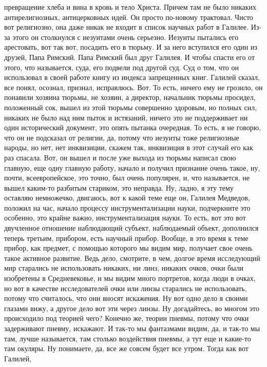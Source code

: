 превращение хлеба и вина в кровь и тело Христа. Причем там не было никаких
антирелигиозных, антицерковных идей. Он просто по-новому трактовал. Чисто вот
религиозно, она даже никак не входит в список научных работ в Галилее. Из-за
этого он столкнулся с иезуитами очень серьезно. Иезуиты пытались его арестовать,
вот так вот, посадить его в тюрьму. И за него вступился его один из друзей, Папа
Римский. Папа Римский был друг Галилея. И чтобы спасти его от этого, что
называется, суда, его подвели под другой суд. Суд о том, что он использовал в
своей работе книгу из индекса запрещенных книг. Галилей сказал, все понял,
осознал, признал, исправлюсь. Вот. То есть, ничего ему не грозило, он понавили
хозяина тюрьмы, не хозяин, а директор, начальник тюрьмы просидел, положенный
сок, вышел из этой тюрьмы совершенно здоровым, но полных сил, никаких не было
над ним пыток и истязаний, ничего это не поддерживает ни один исторический
документ, это опять пытанка очередная. То есть, я не говорю, что он не подсказал
от религии, да, потому что иезуиты тоже религиозные народы, но нет, нет
инквизиции, скажем так, инквизиция в этот случай его как раз спасала. Вот, он
вышел и после уже выхода из тюрьмы написал свою главную, еще одну главную
работу, начало и получил признание очень такое, ну, почти, всеевропейское, это
точно, был очень популярен, и, что называется, не вышел каким-то разбитым
стариком, это неправда. Ну, ладно, я эту тему оставляю немножечко, двигаюсь, вот
к какой теме еще он, Галилея Медведов, положил на час, начало процессу
инструментализации науки, подчеркните это особенно, это крайне важно,
инструментализация науки. То есть, вот это вот двучленное отношение наблюдающий
субъект, наблюдаемый объект, дополнился теперь третьим, прибором, есть научный
прибор. Вообще, в это время к теме прибор, как предмет, с помощью которого мы
видим мир, получает свое очень такое активное развитие. Ведь дело, смотрите, в
чем, долгое время исследующий мир старались не использовать никаких, ни линз,
никаких очков, очки были изобретены в Средневековье, и мы видим много портретов,
когда люди в очках, но вот в качестве исследователей очки или линзы старались не
использовать, потому что считалось, что они вносят искажения. Ну вот одно дело я
своими глазами вижу, а другое дело вот эти через линзы. Ну догадайтесь, во
многом это происходило под теорией чего? Конечно же, теории пневмы, потому что
очки задерживают пневму, искажают. И так-то мы фантазмами видим, да, и так-то мы
там, лучше называется, там столько воздействия пневмы, а тут еще и какие-то там
окуляры. Ну понимаете, да, все же совсем будет все утром. Тогда как вот Галилей,
